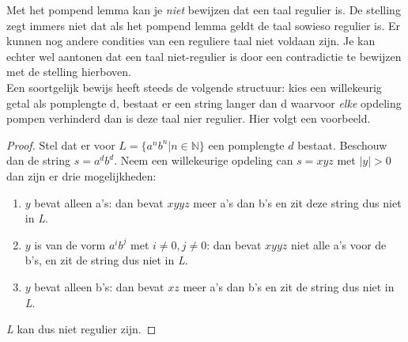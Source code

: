 Met het pompend lemma kan je \emph{niet} bewijzen dat een taal regulier is. De stelling zegt immers niet dat als het pompend lemma geldt de taal sowieso regulier is. Er kunnen nog andere condities van een reguliere taal niet voldaan zijn. Je kan echter wel aantonen dat een taal niet-regulier is door een contradictie te bewijzen met de stelling hierboven.\\

Een soortgelijk bewijs heeft steeds de volgende structuur: kies een willekeurig getal als pomplengte d, bestaat er een string langer dan d waarvoor \emph{elke} opdeling pompen verhinderd dan is deze taal nier regulier. Hier volgt een voorbeeld.

\begin{proof}
Stel dat er voor $L= \{a^nb^n | n \in \mathbb{N}\}$ een pomplengte $d$ bestaat. Beschouw dan de string $s=a^db^d$. Neem een willekeurige opdeling can $s=xyz$ met $|y| > 0$ dan zijn er drie mogelijkheden:
\begin{enumerate}
\item $y$ bevat alleen a's: dan bevat $xyyz$ meer a's dan b's en zit deze string dus niet in \emph{L}.
\item $y$ is van de vorm $a^ib^j$ met $i \neq 0, j \neq 0$: dan bevat $xyyz$ niet alle a's voor de b's, en zit de string dus niet in \emph{L}.
\item $y$ bevat alleen b's: dan bevat $xz$ meer a's dan b's en zit de string dus niet in \emph{L}.
\end{enumerate}
\emph{L} kan dus niet regulier zijn.
\end{proof}
